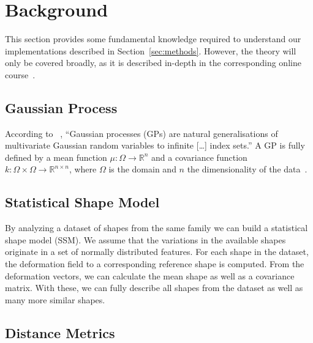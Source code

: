 \section{Background}
\label{sec:background}

This section provides some fundamental knowledge required to understand our implementations described in Section~\ref{sec:methods}.
However, the theory will only be covered broadly, as it is described in-depth in the corresponding online course~\citep{mooc2019statistical}.


\subsection{Gaussian Process}
\label{subsec:gp}

According to \citeauthor{seeger2004gaussian}~\cite{seeger2004gaussian}, ``Gaussian processes (GPs) are natural generalisations of multivariate Gaussian random variables to infinite [\dots] index sets.''
A GP is fully defined by a mean function $ \mu : \Omega \rightarrow \mathbb{R}^n $ and a covariance function $k : \Omega \times \Omega \rightarrow \mathbb{R}^{n \times n} $, where $\Omega$ is the domain and $n$ the dimensionality of the data~\citep{mooc2019statistical}.


\subsection{Statistical Shape Model}
\label{subsec:ssm}

By analyzing a dataset of shapes from the same family we can build a statistical shape model (SSM).
We assume that the variations in the available shapes originate in a set of normally distributed features.
For each shape in the dataset, the deformation field to a corresponding reference shape is computed.
From the deformation vectors, we can calculate the mean shape as well as a covariance matrix.
With these, we can fully describe all shapes from the dataset as well as many more similar shapes.


\subsection{Distance Metrics}
\label{subsec:metrics}

